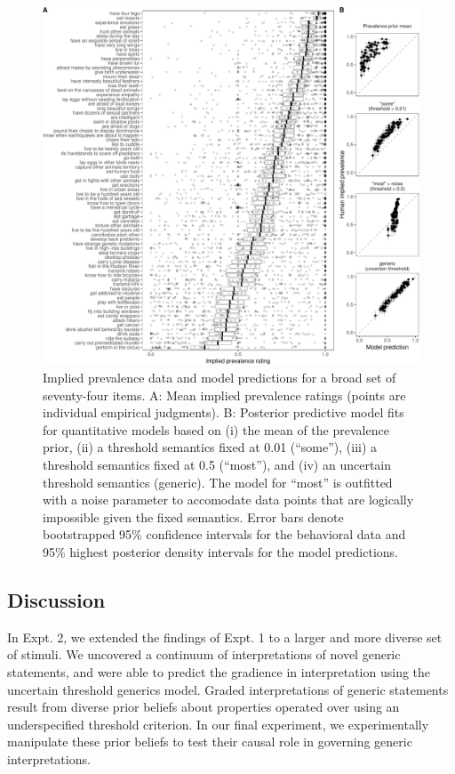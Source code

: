 \documentclass[,man,floatsintext]{apa6}
\theoremstyle{definition}
\theoremstyle{definition}
\theoremstyle{definition}
\theoremstyle{remark}
\begin{document}
\begin{figure}
\centering
\includegraphics{genint_files/figure-latex/genint-modelingResults-1.pdf}
\caption{\label{fig:genint-modelingResults}Implied prevalence data and model
predictions for a broad set of seventy-four items. A: Mean implied
prevalence ratings (points are individual empirical judgments). B:
Posterior predictive model fits for quantitative models based on (i) the
mean of the prevalence prior, (ii) a threshold semantics fixed at 0.01
(\enquote{some}), (iii) a threshold semantics fixed at 0.5
(\enquote{most}), and (iv) an uncertain threshold semantics (generic).
The model for \enquote{most} is outfitted with a noise parameter to
accomodate data points that are logically impossible given the fixed
semantics. Error bars denote bootstrapped 95\% confidence intervals for
the behavioral data and 95\% highest posterior density intervals for the
model predictions.}
\end{figure}

\hypertarget{discussion-1}{%
\subsection{Discussion}\label{discussion-1}}

In Expt. 2, we extended the findings of Expt. 1 to a larger and more
diverse set of stimuli. We uncovered a continuum of interpretations of
novel generic statements, and were able to predict the gradience in
interpretation using the uncertain threshold generics model. Graded
interpretations of generic statements result from diverse prior beliefs
about properties operated over using an underspecified threshold
criterion. In our final experiment, we experimentally manipulate these
prior beliefs to test their causal role in governing generic
interpretations.
\end{document}
